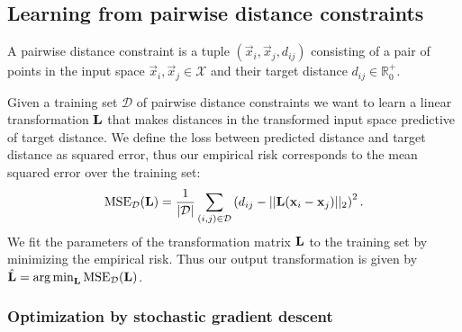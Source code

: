 \subsection{Learning from pairwise distance constraints}


A pairwise distance constraint is a tuple $(\vec{x}_i, \vec{x}_j, d_{ij})$ consisting of a pair of points in the input space $\vec{x}_i, \vec{x}_j \in \mathcal{X}$ and their target distance $d_{ij} \in \mathbb{R}_0^+$. 

Given a training set $\mathcal{D}$ of pairwise distance constraints we want to learn a linear transformation $\mathbf{L}$ that makes distances in the transformed input space predictive of target distance. We define the loss between predicted distance and target distance as squared error, thus our empirical risk corresponds to the mean squared error over the training set:
\begin{equation}
\text{MSE}_\mathcal{D}(\mathbf{L}) = \frac{1}{|\mathcal{D}|}\sum_{(i,j) \in \mathcal{D}} \left ( d_{ij} - ||\mathbf{L} (\mathbf{x}_i - \mathbf{x}_j)||_2 \right)^2.
\label{eq:mse}
\end{equation}
We fit the parameters of the transformation matrix $\mathbf{L}$ to the training set by minimizing the empirical risk. Thus our output transformation is given by $\hat{\mathbf{L}} = \operatorname*{arg\,min}_{\mathbf{L}} \text{MSE}_\mathcal{D}(\mathbf{L})$. 

\subsubsection{Optimization by stochastic gradient descent}

